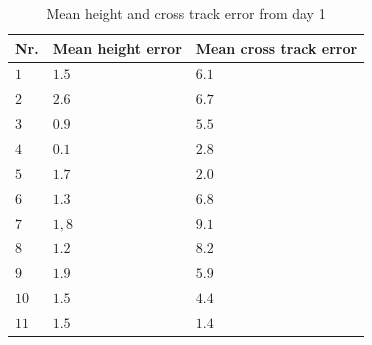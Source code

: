 \begin{table}[H]
\centering
\begin{tabular}{| l | l | l |}
\hline
\textbf{Nr.} 	& \textbf{Mean height error} 	& \textbf{Mean cross track error}  \\ \hline
$1$				& $1.5$							& $6.1$								\\ \hline
$2$				& $2.6$							& $6.7$								\\ \hline
$3$				& $0.9$							& $5.5$								\\ \hline
$4$				& $0.1$							& $2.8$								\\ \hline
$5$				& $1.7$							& $2.0$								\\ \hline
$6$				& $1.3$							& $6.8$								\\ \hline
$7$				& $1,8$							& $9.1$								\\ \hline
$8$				& $1.2$							& $8.2$								\\ \hline
$9$				& $1.9$							& $5.9$								\\ \hline
$10$			& $1.5$							& $4.4$								\\ \hline
$11$			& $1.5$							& $1.4$								\\ \hline
\end{tabular}
\caption{Mean height and cross track error from day 1}
\end{table}

